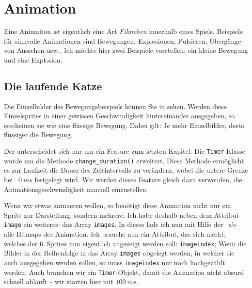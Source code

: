 \newpage
\section{Animation}
Eine Animation ist eigentlich eine Art \emph{Filmchen} innerhalb eines Spiels. Beispiele für sinnvolle Animationen sind Bewegungen, Explosionen, Pulsieren, Übergänge von Aussehen usw.. Ich möchte hier zwei Beispiele vorstellen: ein kleine Bewegung und eine Explosion.

\subsection{Die laufende Katze}


Die Einzelbilder des Bewegungsbeispiels können Sie in  sehen. Werden diese Einzelsprites in einer gewissen Geschwindigkeit hintereinander ausgegeben, so erscheinen sie wie eine flüssige Bewegung. Dabei gilt: Je mehr Einzelbilder, desto flüssiger die Bewegung.

Der  unterscheidet sich nur um ein Feature zum letzten Kapitel. Die \texttt{Timer}-Klasse wurde um die Methode \texttt{change\_duration()} erweitert. Diese Methode ermöglicht es zur Laufzeit die Dauer des Zeitintervalls zu verändern, wobei die untere Grenze bei ~$0~ms$ festgelegt wird. Wir werden dieses Feature gleich dazu verwenden, die Animationsgeschwindigkeit manuell einzustellen. 


Wenn wir etwas animieren wollen, so benötigt diese Animation nicht nur ein Sprite zur Darstellung, sondern mehrere. Ich habe deshalb neben dem Attribut \texttt{image} ein weiteres: das Array \texttt{images}. In dieses lade ich nun mit Hilfe der \forSchleife\ ab  alle Bitmaps der Animation. Ich brauche nun ein Attribut, das sich merkt, welches der 6~Sprites nun eigentlich angezeigt werden soll: \texttt{imageindex}; Wenn die Bilder in der Reihenfolge in das Array \texttt{images} abgelegt werden, in welcher sie auch ausgegeben werden sollen, so muss \texttt{imageindex} nur noch hochgezählt werden. Auch brauchen wir ein \texttt{Timer}-Objekt, damit die Animation nicht absurd schnell abläuft -- wir starten hier mit $100~ms$.

